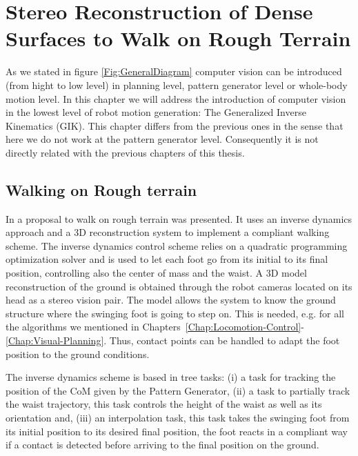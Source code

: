 \chapter{Stereo Reconstruction of Dense Surfaces to Walk on Rough Terrain} 
\label{Chap:3DReconstruction}

As we stated in figure \ref{Fig:GeneralDiagram} computer vision can be introduced (from hight to low level) in planning level, pattern generator level or whole-body motion level. In this chapter we will address the introduction of computer vision in the lowest level of robot motion generation: The Generalized Inverse Kinematics (GIK). This chapter differs from the previous ones in the sense that here we do not work at the pattern generator level. Consequently it is not directly related with the previous chapters of this thesis.

\section{Walking on Rough terrain}

In \citep{RamosIJHR2013} a proposal to walk on rough terrain was presented. It uses an inverse dynamics approach and a 3D reconstruction system to implement a compliant walking scheme. The inverse dynamics control scheme relies on a quadratic programming optimization solver and is used to let each foot go from its initial to its final position, controlling also the center of mass and the waist. A 3D model reconstruction of the ground is obtained through the robot cameras located on its head as a stereo vision pair. The model allows the system to know the ground structure where the swinging foot is going to step on. This is needed, e.g. for all the algorithms we mentioned in Chapters~\ref{Chap:Locomotion-Control}-\ref{Chap:Visual-Planning}. Thus, contact points can be handled to adapt the foot position to the ground conditions.

The inverse dynamics scheme is based in tree tasks: (i) a task for tracking the position of the CoM given by the Pattern Generator, (ii) a task to partially track the waist trajectory, this task controls the height of the waist as well as its orientation and, (iii) an interpolation task, this task takes the swinging foot from its initial position to its desired final position, the foot reacts in a compliant way if a contact is detected before arriving to the final position on the ground.

